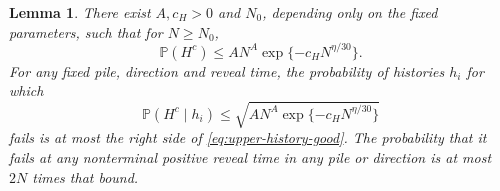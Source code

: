 \documentclass[11pt]{article}
\numberwithin{equation}{section}
\newtheorem{lemma}[theorem]{Lemma}
\theoremstyle{definition}
\theoremstyle{remark}
\newcommand{\Pp}{\mathbb P}
\newcommand{\1}{\mathbf 1}
\begin{document}
\begin{lemma}%
\label{lem:upper-history-good}
There exist $A,c_H>0$ and $N_0$, depending only on the fixed
parameters, such that for $N\ge N_0$,
\begin{equation}\label{eq:upper-H}
 \Pp(H^c)\le AN^A\exp\{-c_H N^{\eta/30}\}.
\end{equation}
For any fixed pile, direction and reveal time, the probability of
histories $h_i$ for which
\begin{equation}\label{eq:upper-history-good}
 \Pp(H^c\mid h_i)\le
          \sqrt{AN^A\exp\{-c_H N^{\eta/30}\}}
\end{equation}
fails is at most the right side of \eqref{eq:upper-history-good}.
The probability that it fails at any nonterminal positive reveal
time in any pile or direction is at most $2N$ times that bound.
\end{lemma}
\end{document}
